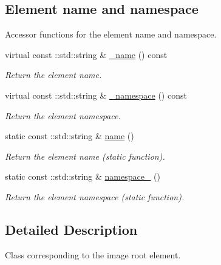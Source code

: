 \subsection*{Element name and namespace}
\label{_amgrpd4b5b61f6e07390f4af2465e04571f34}
Accessor functions for the element name and namespace. \begin{DoxyCompactItemize}
\item 
virtual const ::std::string \& \hyperlink{classopenstack_1_1xml_1_1Image___a87052940399c23bc42e5d4bd3c6fea82}{\_\-name} () const 
\begin{DoxyCompactList}\small\item\em Return the element name. \item\end{DoxyCompactList}\item 
virtual const ::std::string \& \hyperlink{classopenstack_1_1xml_1_1Image___add35acab3196910dca7318328b9cb453}{\_\-namespace} () const 
\begin{DoxyCompactList}\small\item\em Return the element namespace. \item\end{DoxyCompactList}\item 
static const ::std::string \& \hyperlink{classopenstack_1_1xml_1_1Image___af4f3afaff36572d1ebb92f39e23c7e9b}{name} ()
\begin{DoxyCompactList}\small\item\em Return the element name (static function). \item\end{DoxyCompactList}\item 
static const ::std::string \& \hyperlink{classopenstack_1_1xml_1_1Image___ae37100420d8a2990d97a69817515d65e}{namespace\_\-} ()
\begin{DoxyCompactList}\small\item\em Return the element namespace (static function). \item\end{DoxyCompactList}\end{DoxyCompactItemize}


\subsection{Detailed Description}
Class corresponding to the image root element. 

